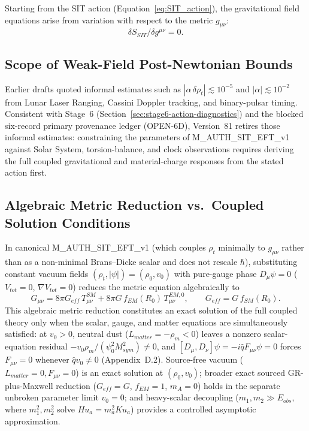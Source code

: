 \documentclass[american,11pt,letterpaper]{article}
\def\mathcal#1{#1}%
\def\mathrm#1{#1}%
\def\texttt#1{#1}%
\def\emph#1{#1}%
\begin{document}
Starting from the SIT action (Equation~\eqref{eq:SIT_action}), the gravitational field equations arise from variation with respect to the metric \(g_{\mu\nu}\):
\[
\delta S_{\mathrm{SIT}}/\delta g^{\mu\nu} = 0.
\]

\subsection{Scope of Weak-Field Post-Newtonian Bounds}

Earlier drafts quoted informal estimates such as $|\alpha\,\delta\rho_t| \lesssim 10^{-5}$ and $|\alpha| \lesssim 10^{-2}$ from Lunar Laser Ranging, Cassini Doppler tracking, and binary-pulsar timing. Consistent with Stage~6 (Section~\ref{sec:stage6-action-diagnostics}) and the blocked six-record primary provenance ledger (\texttt{OPEN-6D}), Version~81 retires those informal estimates: constraining the parameters of \texttt{M\_AUTH\_SIT\_EFT\_v1} against Solar System, torsion-balance, and clock observations requires deriving the full coupled gravitational and material-charge responses from the stated action first.

\subsection{Algebraic Metric Reduction vs.\ Coupled Solution Conditions}

In canonical \texttt{M\_AUTH\_SIT\_EFT\_v1} (which couples $\rho_t$ minimally to $g_{\mu\nu}$ rather than as a non-minimal Brans--Dicke scalar and does not rescale $\hbar$), substituting constant vacuum fields $(\rho_t, |\psi|) = (\rho_0, v_0)$ with pure-gauge phase $D_\mu\psi = 0$ ($V_{\mathrm{tot}} = 0$, $\nabla V_{\mathrm{tot}} = 0$) reduces the \emph{metric} equation algebraically to
\[
G_{\mu\nu} = 8\pi G_{\mathrm{eff}}\,T_{\mu\nu}^{\mathrm{SM}} + 8\pi G\,f_{\mathrm{EM}}(R_0)\,T_{\mu\nu}^{\mathrm{EM},0},
\qquad
G_{\mathrm{eff}} = G\,f_{\mathrm{SM}}(R_0).
\]
This algebraic metric reduction constitutes an \emph{exact solution of the full coupled theory} only when the scalar, gauge, and matter equations are simultaneously satisfied: at $v_0 > 0$, neutral dust ($\mathcal{L}_{\mathrm{matter}} = -\rho_m < 0$) leaves a nonzero scalar-equation residual $-v_0\rho_m/(\psi_0^2 M_{\mathrm{sym}}^2) \ne 0$, and $[D_\mu, D_\nu]\psi = -i\hat{q}F_{\mu\nu}\psi = 0$ forces $F_{\mu\nu} = 0$ whenever $\hat{q}v_0 \ne 0$ (Appendix~D.2). Source-free vacuum ($\mathcal{L}_{\mathrm{matter}} = 0, F_{\mu\nu} = 0$) is an exact solution at $(\rho_0, v_0)$; broader exact sourced GR-plus-Maxwell reduction ($G_{\mathrm{eff}} = G$, $f_{\mathrm{EM}} = 1$, $m_A = 0$) holds in the separate unbroken parameter limit $v_0 = 0$; and heavy-scalar decoupling ($m_1, m_2 \gg E_{\mathrm{obs}}$, where $m_1^2, m_2^2$ solve $H u_a = m_a^2 K u_a$) provides a controlled asymptotic approximation.
\end{document}
